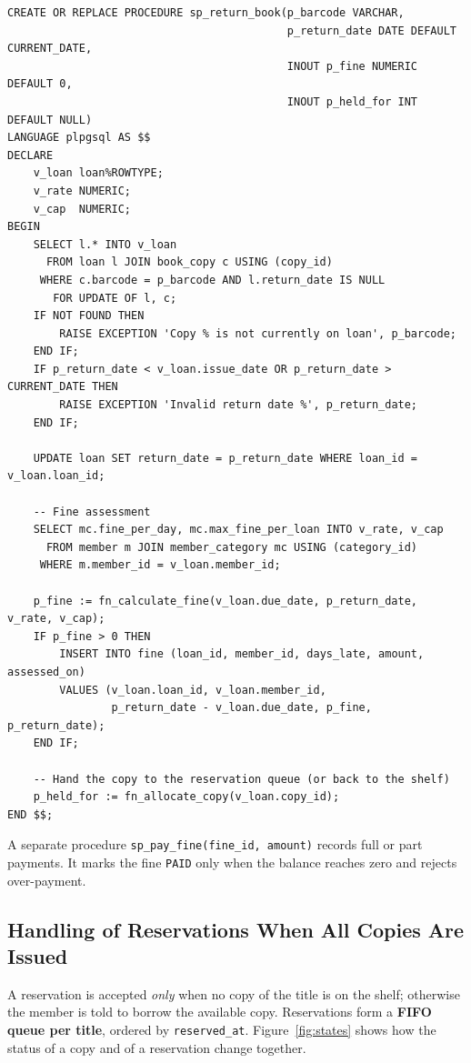 \documentclass[11pt,a4paper]{report}
\begin{document}
\begin{lstlisting}[caption={The \texttt{sp\_return\_book} procedure}, label={lst:return}]
CREATE OR REPLACE PROCEDURE sp_return_book(p_barcode VARCHAR,
                                           p_return_date DATE DEFAULT CURRENT_DATE,
                                           INOUT p_fine NUMERIC DEFAULT 0,
                                           INOUT p_held_for INT DEFAULT NULL)
LANGUAGE plpgsql AS $$
DECLARE
    v_loan loan%ROWTYPE;
    v_rate NUMERIC;
    v_cap  NUMERIC;
BEGIN
    SELECT l.* INTO v_loan
      FROM loan l JOIN book_copy c USING (copy_id)
     WHERE c.barcode = p_barcode AND l.return_date IS NULL
       FOR UPDATE OF l, c;
    IF NOT FOUND THEN
        RAISE EXCEPTION 'Copy % is not currently on loan', p_barcode;
    END IF;
    IF p_return_date < v_loan.issue_date OR p_return_date > CURRENT_DATE THEN
        RAISE EXCEPTION 'Invalid return date %', p_return_date;
    END IF;

    UPDATE loan SET return_date = p_return_date WHERE loan_id = v_loan.loan_id;

    -- Fine assessment
    SELECT mc.fine_per_day, mc.max_fine_per_loan INTO v_rate, v_cap
      FROM member m JOIN member_category mc USING (category_id)
     WHERE m.member_id = v_loan.member_id;

    p_fine := fn_calculate_fine(v_loan.due_date, p_return_date, v_rate, v_cap);
    IF p_fine > 0 THEN
        INSERT INTO fine (loan_id, member_id, days_late, amount, assessed_on)
        VALUES (v_loan.loan_id, v_loan.member_id,
                p_return_date - v_loan.due_date, p_fine, p_return_date);
    END IF;

    -- Hand the copy to the reservation queue (or back to the shelf)
    p_held_for := fn_allocate_copy(v_loan.copy_id);
END $$;
\end{lstlisting}

A separate procedure \texttt{sp\_pay\_fine(fine\_id, amount)} records full or part payments. It marks the fine \texttt{PAID} only when the balance reaches zero and rejects over-payment.

\subsection{Handling of Reservations When All Copies Are Issued}
\label{sec:resv}
A reservation is accepted \emph{only} when no copy of the title is on the shelf; otherwise the member is told to borrow the available copy. Reservations form a \textbf{FIFO queue per title}, ordered by \texttt{reserved\_at}. Figure~\ref{fig:states} shows how the status of a copy and of a reservation change together.
\end{document}
